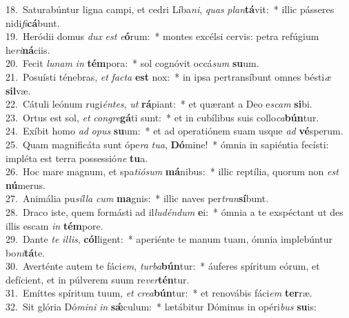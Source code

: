 {18.~}Saturabúntur ligna campi, et cedri Líba\textit{ni}, \textit{quas} \textit{plan}\textbf{tá}vit:~* illic pásseres nidi\textit{fi}\textbf{cá}bunt.\\
{19.~}Heródii domus \textit{dux} \textit{est} \textit{e}\textbf{ó}rum:~* montes excélsi cervis: petra refúgium he\textit{ri}\textbf{ná}ciis.\\
{20.~}Fecit \textit{lu}\textit{nam} \textit{in} \textbf{tém}pora:~* sol cognóvit occá\textit{sum} \textbf{su}um.\\
{21.~}Posuísti ténebras, \textit{et} \textit{fa}\textit{cta} \textbf{est} nox:~* in ipsa pertransíbunt omnes bésti\textit{æ} \textbf{sil}væ.\\
{22.~}Cátuli leónum rugi\textit{én}\textit{tes}, \textit{ut} \textbf{rá}piant:~* et quærant a Deo e\textit{scam} \textbf{si}bi.\\
{23.~}Ortus est sol, \textit{et} \textit{con}\textit{gre}\textbf{gá}ti sunt:~* et in cubílibus suis collo\textit{ca}\textbf{bún}tur.\\
{24.~}Exíbit homo \textit{ad} \textit{o}\textit{pus} \textbf{su}um:~* et ad operatiónem suam usque \textit{ad} \textbf{vé}sperum.\\
{25.~}Quam magnificáta sunt ópe\textit{ra} \textit{tu}\textit{a}, \textbf{Dó}mine!~* ómnia in sapiéntia fecísti: impléta est terra possessió\textit{ne} \textbf{tu}a.\\
{26.~}Hoc mare magnum, et spa\textit{ti}\textit{ó}\textit{sum} \textbf{má}nibus:~* illic reptília, quorum non \textit{est} \textbf{nú}merus.\\
{27.~}Animália pu\textit{síl}\textit{la} \textit{cum} \textbf{ma}gnis:~* illic naves per\textit{tran}\textbf{sí}bunt.\\
{28.~}Draco iste, quem formásti ad il\textit{lu}\textit{dén}\textit{dum} \textbf{e}i:~* ómnia a te exspéctant ut des illis escam \textit{in} \textbf{tém}pore.\\
{29.~}Dante \textit{te} \textit{il}\textit{lis}, \textbf{cól}ligent:~* aperiénte te manum tuam, ómnia implebúntur bo\textit{ni}\textbf{tá}te.\\
{30.~}Averténte autem te fáci\textit{em}, \textit{tur}\textit{ba}\textbf{bún}tur:~* áuferes spíritum eórum, et defícient, et in púlverem suum re\textit{ver}\textbf{tén}tur.\\
{31.~}Emíttes spíritum tuum, \textit{et} \textit{cre}\textit{a}\textbf{bún}tur:~* et renovábis fáci\textit{em} \textbf{ter}ræ.\\
{32.~}Sit glória Dó\textit{mi}\textit{ni} \textit{in} \textbf{sǽ}culum:~* lætábitur Dóminus in opéri\textit{bus} \textbf{su}is:\\
